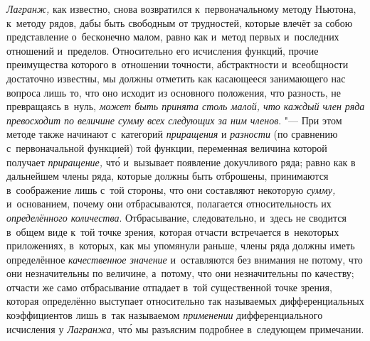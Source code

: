 {\em Лагранж,} как известно, снова возвратился к~первоначальному методу
Ньютона, к~методу рядов, дабы быть свободным от трудностей, которые влечёт за
собою представление о~бесконечно малом, равно как и~метод первых и~последних
отношений и~пределов. Относительно его исчисления функций, прочие преимущества
которого в~отношении точности, абстрактности и~всеобщности достаточно известны,
мы должны отметить как касающееся занимающего нас вопроса лишь то, что оно
исходит из основного положения, что разность, не превращаясь в~нуль,
{\em может быть принята столь малой, что каждый член ряда превосходит по
величине сумму всех следующих за ним членов}. "--- При этом методе также
начинают с~категорий {\em приращения} и {\em разности} (по сравнению
с~первоначальной функцией) той функции, переменная величина которой получает
{\em приращение,} чт\'{о} и~вызывает появление докучливого ряда; равно как в
дальнейшем члены ряда, которые должны быть отброшены, принимаются в~соображение
лишь с~той стороны, что они составляют некоторую {\em сумму,} и~основанием,
почему они отбрасываются, полагается относительность их {\em определённого
количества}. Отбрасывание, следовательно, и~здесь не сводится в~общем виде
к~той точке зрения, которая отчасти встречается в~некоторых приложениях,
в~которых, как мы упомянули раньше, члены ряда должны иметь определённое
{\em качественное значение} и~оставляются без внимания не потому, что они
незначительны по величине, а~потому, что они незначительны по качеству;
отчасти же само отбрасывание отпадает в~той существенной точке зрения,
которая определённо выступает относительно так называемых дифференциальных
коэффициентов лишь в~так называемом {\em применении} дифференциального
исчисления у {\em Лагранжа,} чт\'{о} мы разъясним подробнее в~следующем примечании.

